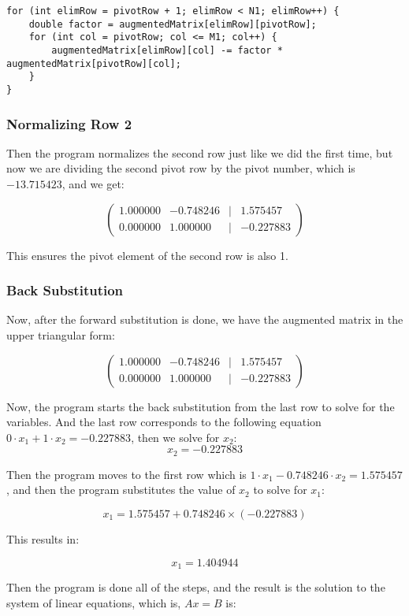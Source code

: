 \documentclass[a4paper]{article}
\begin{document}
\begin{verbatim}
for (int elimRow = pivotRow + 1; elimRow < N1; elimRow++) {
    double factor = augmentedMatrix[elimRow][pivotRow];
    for (int col = pivotRow; col <= M1; col++) {
        augmentedMatrix[elimRow][col] -= factor * augmentedMatrix[pivotRow][col];
    }
}
\end{verbatim}

\subsubsection{Normalizing Row 2}
Then the program normalizes the second row just like we did the first time, but now we are dividing the second pivot row by the pivot number, which is \(-13.715423\), and we get:

\[
\begin{pmatrix}
1.000000 & -0.748246 & | & 1.575457 \\
0.000000 & 1.000000 & | & -0.227883
\end{pmatrix}
\]

This ensures the pivot element of the second row is also 1.

\subsubsection{Back Substitution}
Now, after the forward substitution is done, we have the augmented matrix in the upper triangular form:

\[
\begin{pmatrix}
1.000000 & -0.748246 & | & 1.575457 \\
0.000000 & 1.000000 & | & -0.227883
\end{pmatrix}
\]

Now, the program starts the back substitution from the last row to solve for the variables. And the last row corresponds to the following equation \(0 \cdot x_1 + 1 \cdot x_2 = -0.227883\), then we solve for \(x_2\):
\[
x_2 = -0.227883
\]

Then the program moves to the first row which is \(1 \cdot x_1 - 0.748246 \cdot x_2 = 1.575457\), and then the program substitutes the value of \(x_2\) to solve for \(x_1\):

\[
x_1 = 1.575457 + 0.748246 \times (-0.227883)
\]

This results in:

\[
x_1 = 1.404944
\]

Then the program is done all of the steps, and the result is the solution to the system of linear equations, which is, \(Ax = B\) is:
\end{document}
